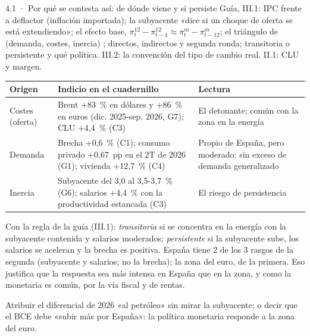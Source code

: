 \begin{complemento}{4.1 · Por qué se contesta así: de dónde viene y si persiste}
 Guía, III.1: IPC frente a deflactor (inflación importada); la subyacente «dice si un choque de oferta se está extendiendo»; el efecto base, $\pi^{12}_t-\pi^{12}_{t-1}\approx\pi^m_t-\pi^m_{t-12}$; el triángulo de  (demanda, costes, inercia) \parencite{Gordon2011Phillips}; directos, indirectos y segunda ronda; transitoria o persistente y qué política. III.2: la convención del tipo de cambio real. II.1: CLU y margen.

\begin{tablacaja}
\centering\scriptsize
\caption{El triángulo de  con los datos de España en 2025-2026}\label{tab:gordon}
\begin{tabular}{>{\raggedright\arraybackslash}p{2.6cm}>{\raggedright\arraybackslash}p{7.2cm}>{\raggedright\arraybackslash}p{4.2cm}}
\toprule
\rowcolor{tceeazulpalido}
\textbf{Origen} & \textbf{Indicio en el cuadernillo} & \textbf{Lectura} \\
\midrule
Costes (oferta) & Brent +83~\% en dólares y +86~\% en euros (dic. 2025-sep. 2026, G7); CLU +4,4~\% (C3) & El detonante; común con la zona en la energía \\
Demanda & Brecha +0,6~\% (C1); consumo privado +0,67~pp en el 2T de 2026 (G1); vivienda +12,7~\% (C4) & Propio de España, pero moderado: sin exceso de demanda generalizado \\
Inercia & Subyacente del 3,0 al 3,5-3,7~\% (G6); salarios +4,4~\% con la productividad estancada (C3) & El riesgo de persistencia \\
\bottomrule
\end{tabular}
\end{tablacaja}

 Con la regla de la guía (III.1): \emph{transitoria} si se concentra en la energía con la subyacente contenida y salarios moderados; \emph{persistente} si la subyacente sube, los salarios se aceleran y la brecha es positiva. España tiene 2 de los 3 rasgos de la segunda (subyacente y salarios; no la brecha); la zona del euro, de la primera. Eso justifica que la respuesta sea más intensa en España que en la zona, y como la monetaria es común, por la vía fiscal y de rentas.

 Atribuir el diferencial de 2026 «al petróleo» sin mirar la subyacente; o decir que el BCE debe «subir más por España»: la política monetaria responde a la zona del euro.
\end{complemento}

